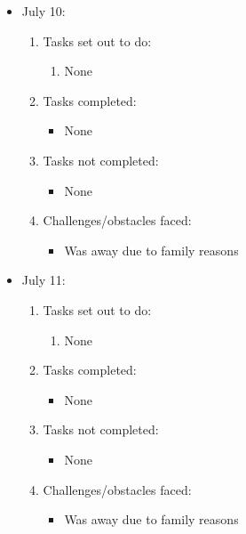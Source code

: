 \documentclass[12pt]{article}
\begin{document}
	\begin{itemize}
		\item July 10:
		\begin{enumerate}
			\item Tasks set out to do:
			\begin{enumerate}
				\item None
			\end{enumerate}
			\item Tasks completed:
			\begin{itemize}
				\item None
			\end{itemize}
			\item Tasks not completed:
			\begin{itemize}
				\item None
			\end{itemize}
			\item Challenges/obstacles faced:
			\begin{itemize}
				\item Was away due to family reasons
			\end{itemize}			
		\end{enumerate}
	\end{itemize}
	
	\begin{itemize}
		\item July 11:
		\begin{enumerate}
			\item Tasks set out to do:
			\begin{enumerate}
				\item None
			\end{enumerate}
			\item Tasks completed:
			\begin{itemize}
				\item None
			\end{itemize}
			\item Tasks not completed:
			\begin{itemize}
				\item None
			\end{itemize}
			\item Challenges/obstacles faced:
			\begin{itemize}
				\item Was away due to family reasons
			\end{itemize}			
		\end{enumerate}
	\end{itemize}
	
\end{document}
